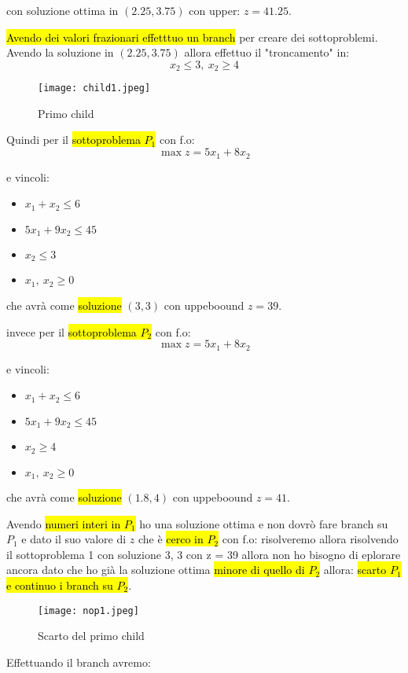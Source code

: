 con soluzione ottima in $(2.25, 3.75)$ con upper: $z = 41.25$.

\hl{Avendo dei valori frazionari effetttuo un branch} per creare dei sottoproblemi. Avendo la soluzione in $(2.25, 3.75)$ allora effettuo il "troncamento" in:
$$x_2 \leq 3,\ x_2 \geq 4$$

\begin{figure}[H]
\centering
\texttt{[image: child1.jpeg]}
\caption{Primo child} 
\label{child1}
\end{figure}

Quindi per il \hl{sottoproblema $P_1$} con f.o:
$$\max z = 5x_1 + 8x_2$$

e vincoli:
\begin{itemize}
    \item $x_1 + x_2 \leq 6$
    \item $5x_1 + 9x_2 \leq 45$
    \item $x_2 \leq 3$
    \item $x_1,\ x_2 \geq 0$
\end{itemize}

che avrà come \hl{soluzione} $(3, 3)$ con uppeboound $z = 39$.

invece per il \hl{sottoproblema $P_2$} con f.o:
$$\max z = 5x_1 + 8x_2$$

e vincoli:
\begin{itemize}
    \item $x_1 + x_2 \leq 6$
    \item $5x_1 + 9x_2 \leq 45$
    \item $x_2 \geq 4$
    \item $x_1,\ x_2 \geq 0$
\end{itemize}

che avrà come \hl{soluzione} $(1.8, 4)$ con uppeboound $z = 41$.

Avendo \hl{numeri interi in $P_1$} ho una soluzione ottima e non dovrò fare branch su $P_1$ e dato il suo valore di $z$ che è \hl{cerco in $P_2$} con f.o:
risolveremo allora risolvendo il sottoproblema 1 con soluzione 3, 3 con z = 39 allora non ho bisogno di eplorare ancora dato che ho già la soluzione ottima \hl{minore di quello di $P_2$} allora: \hl{scarto $P_1$ e continuo i branch su $P_2$}.


\begin{figure}[H]
\centering
\texttt{[image: nop1.jpeg]}
\caption{Scarto del primo child} 
\label{nop1}
\end{figure}


Effettuando il branch avremo:

